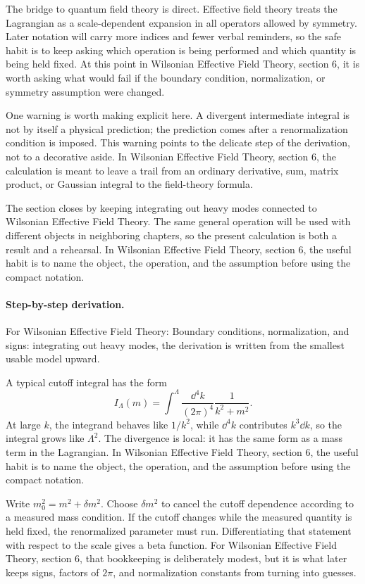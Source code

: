 The bridge to quantum field theory is direct.  Effective field theory treats the Lagrangian as a scale-dependent expansion in all operators allowed by symmetry.  Later notation will carry more indices and fewer verbal reminders, so the safe habit is to keep asking which operation is being performed and which quantity is being held fixed.  At this point in Wilsonian Effective Field Theory, section 6, it is worth asking what would fail if the boundary condition, normalization, or symmetry assumption were changed.

One warning is worth making explicit here.  A divergent intermediate integral is not by itself a physical prediction; the prediction comes after a renormalization condition is imposed.  This warning points to the delicate step of the derivation, not to a decorative aside.  In Wilsonian Effective Field Theory, section 6, the calculation is meant to leave a trail from an ordinary derivative, sum, matrix product, or Gaussian integral to the field-theory formula.

The section closes by keeping integrating out heavy modes connected to Wilsonian Effective Field Theory.  The same general operation will be used with different objects in neighboring chapters, so the present calculation is both a result and a rehearsal.  In Wilsonian Effective Field Theory, section 6, the useful habit is to name the object, the operation, and the assumption before using the compact notation.



\paragraph{Step-by-step derivation.}

For Wilsonian Effective Field Theory: Boundary conditions, normalization, and signs: integrating out heavy modes, the derivation is written from the smallest usable model upward.

A typical cutoff integral has the form
\[
  I_\Lambda(m)=\int^{\Lambda}\frac{\dd^4k}{(2\pi)^4}\frac{1}{k^2+m^2}.
\]
At large \(k\), the integrand behaves like \(1/k^2\), while \(\dd^4k\) contributes \(k^3\dd k\), so the integral grows like \(\Lambda^2\).  The divergence is local: it has the same form as a mass term in the Lagrangian.  In Wilsonian Effective Field Theory, section 6, the useful habit is to name the object, the operation, and the assumption before using the compact notation.

Write \(m_0^2=m^2+\delta m^2\).  Choose \(\delta m^2\) to cancel the cutoff dependence according to a measured mass condition.  If the cutoff changes while the measured quantity is held fixed, the renormalized parameter must run.  Differentiating that statement with respect to the scale gives a beta function.  For Wilsonian Effective Field Theory, section 6, that bookkeeping is deliberately modest, but it is what later keeps signs, factors of \(2\pi\), and normalization constants from turning into guesses.

